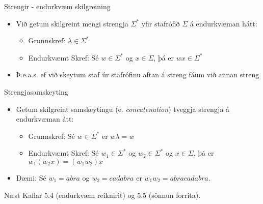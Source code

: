 \documentclass[handout]{beamer}
\begin{document}
\begin{frame}{Strengir - endurkvæm skilgreining}
\begin{itemize}
 \item Við getum skilgreint mengi strengja $\Sigma^*$ yfir stafrófið $\Sigma$ á endurkvæman hátt:
 \begin{itemize}
  \item Grunnskref: $\lambda \in \Sigma^*$
  \item Endurkvæmt Skref: Sé $w \in \Sigma^*$ og $x \in \Sigma$, þá er $wx \in \Sigma^*$
 \end{itemize}
 \item Þ.e.a.s. ef við skeytum staf úr stafrófinu aftan á streng fáum við annan streng
\end{itemize}
\end{frame}

\begin{frame}{Strengjasamskeyting}
\begin{itemize}
 \item Getum skilgreint samskeytingu (e. \emph{concatenation}) tveggja strengja á endurkvæman átt:
 \begin{itemize}
  \item Grunnskref: Sé $w \in \Sigma^*$ er $w\lambda = w$
  \item Endurkvæmt Skref: Sé $w_1 \in \Sigma^*$ og $w_2 \in \Sigma^*$ og $x \in \Sigma$, þá er $w_1(w_2x) = (w_1w_2)x$
 \end{itemize}
 \item Dæmi: Sé $w_1 = abra$ og $w_2 = cadabra$ er $w_1w_2 = abracadabra$.
\end{itemize}
\end{frame}

\begin{frame}{Næst}
Kaflar 5.4 (endurkvæm reiknirit) og 5.5 (sönnun forrita).
\end{frame}
\end{document}
